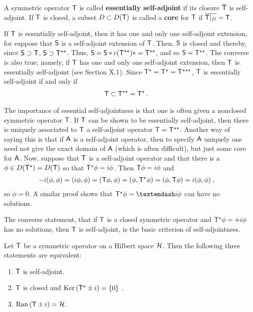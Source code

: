 \begin{definition}
A symmetric operator $\mathsf{T}$ is called \textbf{essentially self-adjoint} if its closure $\overline{\mathsf{T}}$ is self-adjoint. If $\mathsf{T}$ is closed, a subset $D \subset D(\mathsf{T})$ is called a \textbf{core} for $\mathsf{T}$ if $\overline{\mathsf{T}|_{D}} = \mathsf{T}$. 
\end{definition}

If $\mathsf{T}$ is essentially self-adjoint, then it has one and only one self-adjoint extension, for suppose that $\mathsf{S}$ is a self-adjoint extension of $\mathsf{T}$. Then, $\mathsf{S}$ is closed and thereby, since $\mathsf{S} \supset \mathsf{T}$, $\mathsf{S} \supset \mathsf{T}^{\star \star}$. Thus, $\mathsf{S} = \mathsf{S}* c (\mathsf{T}^{\star \star})* = \mathsf{T}^{\star \star}$, and so
$\mathsf{S} = \mathsf{T}^{\star \star}$. The converse is also true; namely, if $\mathsf{T}$ has one and only one self-adjoint extension, then $\mathsf{T}$ is essentially self-adjoint (see Section X.1). Since
$\mathsf{T}^{\star} = \mathsf{T}^{\star} = \mathsf{T}^{\star \star \star}$, $\mathsf{T}$ is essentially self-adjoint if and only if
\begin{align}
    \mathsf{T} \subset \mathsf{T}^{\star \star} = \mathsf{T}^{\star} \:.
\end{align}

The importance of essential self-adjointness is that one is often given a nonclosed symmetric operator $\mathsf{T}$. If $\mathsf{T}$ can be shown to be essentially self-adjoint, then there is uniquely associated to $\mathsf{T}$ a self-adjoint operator $\mathsf{T} = \mathsf{T}^{\star \star}$.
Another way of saying this is that if $\mathsf{A}$ is a self-adjoint operator, then to specify $\mathsf{A}$ uniquely one need not give the exact domain of $\mathsf{A}$ (which is often
difficult), but just some core for $\mathsf{A}$. Now, suppose that $\mathsf{T}$ is a self-adjoint operator and that there is a $\phi \in D(\mathsf{T}^{\star}) = D(\mathsf{T}) $ so that $\mathsf{T}^{\star} \phi = i \phi$. Then $\mathsf{T} \phi = i \phi$ and
\begin{align}
    - i (\phi, \phi) =(i \phi, \phi) = (\mathsf{T} \phi, \phi) = (\phi, \mathsf{T}^\star \phi ) = (\phi, \mathsf{T} \phi) = i (\phi, \phi) \:,
\end{align}
so $\phi = 0$. A similar proof shows that $\op T^\star \phi = —i \phi$ can have no solutions. 

The converse
statement, that if $\mathsf{T}$ is a closed symmetric operator and $\mathsf{T}^\star \phi = + i \phi$ has no solutions, then $\mathsf{T}$ is self-adjoint, is the basic criterion of self-adjointness.

\begin{theorem}
    Let $\mathsf{T}$ be a symmetric operator on a Hilbert space $\mathcal{H}$. Then the following three statements are equivalent:
    \begin{enumerate}
        \item $\mathsf{T}$ is self-adjoint.
        \item $\mathsf{T}$ is closed and $\mathrm{Ker}\, (\mathsf{T}^\star \pm i) = \left \lbrace 0 \right \rbrace$ \:.
        \item $\mathrm{Ran}\,(\mathsf{T} \pm i) = \mathcal{H}$.
    \end{enumerate}
    
\end{theorem}

